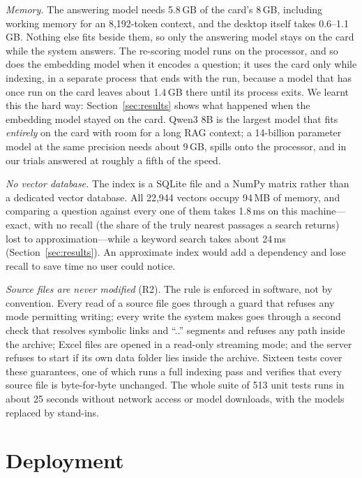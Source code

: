 \documentclass[conference]{IEEEtran}
\begin{document}
\emph{Memory.} The answering model needs 5.8\,GB of the card's 8\,GB, including
working memory for an 8{,}192-token context, and the desktop itself takes
0.6--1.1\,GB. Nothing else fits beside them, so only the answering model stays
on the card while the system answers. The re-scoring model runs on the
processor, and so does the embedding model when it encodes a question; it
uses the card only while indexing, in a separate process that ends with the
run, because a model that has once run on the card leaves about 1.4\,GB there
until its process exits. We learnt this
the hard way: Section~\ref{sec:results} shows what happened when the embedding
model stayed on the card. Qwen3 8B is the largest model that fits
\emph{entirely} on the card with room for a long RAG context; a 14-billion
parameter model at the same precision needs about 9\,GB, spills onto the
processor, and in our trials answered at roughly a fifth of the speed.

\emph{No vector database.} The index is a SQLite file and a NumPy matrix rather
than a dedicated vector database. All 22{,}944 vectors occupy 94\,MB of memory,
and comparing a question against every one of them takes 1.8\,ms on this
machine---exact, with no recall (the share of the truly nearest passages a
search returns) lost to approximation---while a keyword search
takes about 24\,ms (Section~\ref{sec:results}). An approximate index would add a dependency and lose
recall to save time no user could notice.

\emph{Source files are never modified} (R2). The rule is enforced in software,
not by convention. Every read of a source file goes through a guard that
refuses any mode permitting writing; every write the system makes goes through a
second check that resolves symbolic links and ``..'' segments and refuses any
path inside the archive; Excel files are opened in a read-only streaming mode;
and the server refuses to start if its own data folder lies inside the archive.
Sixteen tests cover these guarantees, one of which runs a full indexing pass and
verifies that every source file is byte-for-byte unchanged. The whole suite of
513 unit tests runs in about 25 seconds without network access or model
downloads, with the models replaced by stand-ins.

\section{Deployment}
\end{document}
